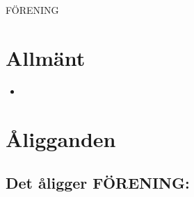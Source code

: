 \documentclass[a4paper]{article}
\begin{document}
\renewcommand{\forening}{FÖRENING} %

\begin{foreningenv}{\forening{}} %
    \section{Allmänt}
    \begin{itemize}
        \item 
    \end{itemize}

    \section{Åligganden}
    \aliggsektfunkt %
        
    \subsection{Det åligger \forening{}:}
    \begin{description}
          \att
    \end{description}
\end{foreningenv}
\end{document}
